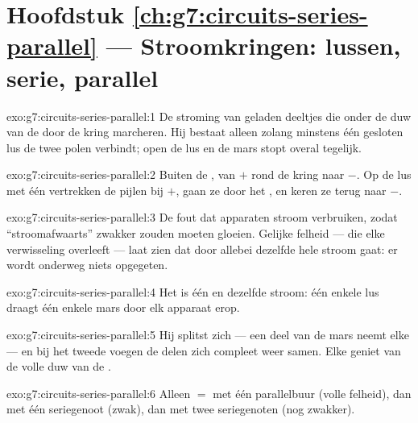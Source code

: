 \section*{Hoofdstuk \ref{ch:g7:circuits-series-parallel} --- Stroomkringen: lussen, serie, parallel}

\begin{solution}{exo:g7:circuits-series-parallel:1}
De stroming van geladen deeltjes die onder de duw van de
 door de kring marcheren. Hij bestaat alleen zolang minstens
één gesloten lus de twee polen verbindt; open de lus en de mars
stopt overal tegelijk.
\end{solution}

\begin{solution}{exo:g7:circuits-series-parallel:2}
Buiten de , van $+$ rond de kring naar $-$. Op de lus met
één  vertrekken de pijlen bij $+$, gaan ze door het
, en keren ze terug naar $-$.
\end{solution}

\begin{solution}{exo:g7:circuits-series-parallel:3}
De fout dat apparaten stroom verbruiken, zodat 
``stroomafwaarts'' zwakker zouden moeten gloeien. Gelijke felheid ---
die elke verwisseling overleeft --- laat zien dat door allebei
dezelfde hele stroom gaat: er wordt onderweg niets opgegeten.
\end{solution}

\begin{solution}{exo:g7:circuits-series-parallel:4}
Het is één en dezelfde stroom: één enkele lus draagt één enkele mars
door elk apparaat erop.
\end{solution}

\begin{solution}{exo:g7:circuits-series-parallel:5}
Hij splitst zich --- een deel van de mars neemt elke  --- en bij
het tweede  voegen de delen zich compleet weer samen. Elke
 geniet van de volle duw van de .
\end{solution}

\begin{solution}{exo:g7:circuits-series-parallel:6}
Alleen $=$ met één parallelbuur (volle felheid), dan met één
seriegenoot (zwak), dan met twee seriegenoten (nog zwakker).
\end{solution}

